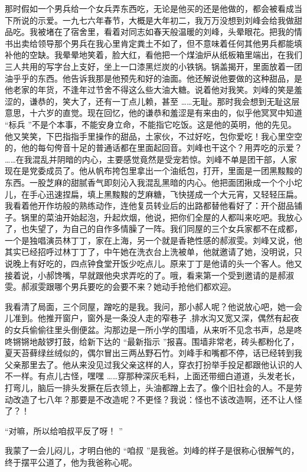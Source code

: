 \documentclass[12pt,twoside,openany]{book}
\begin{document}
那时假如一个男兵给一个女兵弄东西吃，无论是他买的还是他做的，都会被看成当下所说的示爱。一九七六年春节，大概是大年初二，我万万没想到刘峰会给我做甜品吃。我被堵在了宿舍里，看着对同志如春天般温暖的刘峰，头晕眼花。把我的情书出卖给领导那个男兵在我心里肯定粪土不如了，但不意味着任何其他男兵都能填补他的空缺。我晕晕地笑着，脸大红，看他把一个煤油炉从纸板箱里端出，在我们三人共用的写字台上支好，坐上一口漆黑烂炭的小铁锅。锅盖揭开，里面放着一团油乎乎的东西。他告诉我那是他预先和好的油面。他还解说他要做的这种甜品，是他老家的年货，不逢年过节舍不得这么些大油大糖。说着他对我笑。刘峰的笑是羞涩的，谦恭的，笑大了，还有一丁点儿赖，甚至 ……无耻。那时我会想到无耻这层意思，十六岁的直觉。现在回忆，他的谦恭和羞涩是有来由的，似乎他冥冥中知道 “标兵 ”不是个本事，不能安身立命，不能指它吃饭。这是他的英明，他的先见。他又笑笑，下巴指指手里操作的甜品，土家伙，不过好吃，包你爱吃！我心里空空的，他的每句侉音十足的普通话都在里面起回音。刘峰也干这个？用弄吃的示爱？ ……在我混乱并阴暗的内心，主要感觉竟然是受宠若惊。刘峰不单是团干部，人家现在是党委成员了。他从帆布挎包里拿出一个油纸包，打开，里面是一团黑黢黢的东西。一股芝麻的甜腻香气即刻沁入我混乱黑暗的内心。他把面团揪成一个个小坨儿，在手心迅速捏扁，填上黑黢黢的芝麻糖，飞快搓成一个大元宵，又轻轻压扁。我看着他开作坊般的熟练动作，连他复员转业后的出路都替他看好了：开个甜品铺子。锅里的菜油开始起泡，升起炊烟，他说，把你们全屋的人都叫来吃吧。我放心了，也失望了，为自己的自作多情臊了一阵。我们同屋的三个女兵家都不在成都，一个是独唱演员林丁丁，家在上海，另一个就是香艳性感的郝淑雯。刘峰又说，他其实已经招呼过林丁丁了，中午她在洗衣台上洗被单，他就邀请了她，没明说，只说晚上有好吃的，四点钟食堂开饭少吃点儿。原来丁丁是他请的头一个客人。他又接着说，小郝馋嘴，早就跟他央求弄吃的了。哦，看来第一个受到邀请的是郝淑雯。郝淑雯跟哪个男兵要吃的会要不来？她动手抢他们都欢迎。

我看清了局面，三个同屋，蹭吃的是我。我问，那小郝人呢？他说放心吧，她一会儿准到。他推开窗户，窗外是一条没人走的窄巷子 ,排水沟又宽又深，偶然有起夜的女兵偷偷往里头倒便盆。沟那边是一所小学的围墙，从来听不见念书声，总是咚咚锵锵地敲锣打鼓，给新下达的 “最新指示 ”报喜。围墙非常老，砖头都粉化了，夏天苔藓绿丝绒似的，偶尔冒出三两丛野石竹。刘峰手和嘴都不停，话已经转到我父亲那里去了。他从来没见过我父亲这样的人，穿衣打扮举手投足都跟他认识的人不一样。有点儿古怪，嘿嘿 ……穿那种深灰毛料，上面还带细白道道，头发老长，打弯儿，脑后一排头发撅在后衣领上，头油都蹭上去了。像个旧社会的人。不是劳动改造了七八年？那要是不改造呢？不更怪？我说：怪也不该改造啊，还不让人怪了？！

“对嘛，所以给咱叔平反了呀！ ”

我蒙了一会儿闷儿，才明白他的 “咱叔 ”是我爸。刘峰的样子是很称心很解气的，终于摆平公道了，他为我爸称心呢。
\end{document}
